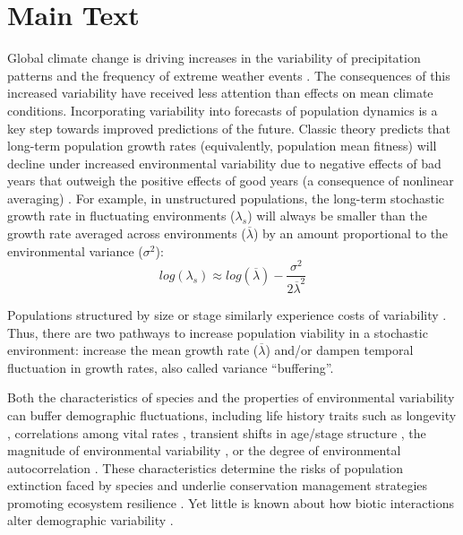 \documentclass[12pt]{article}
\begin{document}
\section*{Main Text}

Global climate change is driving increases in the variability of precipitation patterns and the frequency of extreme weather events \cite{IPCC2012managing,seneviratne2012changes,stocker2013technical}. 
The consequences of this increased variability have received less attention than effects on mean climate conditions. 
Incorporating variability into forecasts of population dynamics is a key step towards improved predictions of the future.
Classic theory predicts that long-term population growth rates (equivalently, population mean fitness) will decline under increased environmental variability due to negative effects of bad years that outweigh the positive effects of good years (a consequence of nonlinear averaging) \cite{lewontin_population_1969,tuljapurkar_population_1982}.
For example, in unstructured populations, the long-term stochastic growth rate in fluctuating environments ($\lambda_s$) will always be smaller than the growth rate averaged across environments ($\overline{\lambda}$) by an amount proportional to the environmental variance ($\sigma^2$): 
\begin{equation}
	 log(\lambda_s)  \approx log(\overline{\lambda}) - \frac{\sigma^2}{2\overline{\lambda}^2}
\end{equation}

Populations structured by size or stage similarly experience costs of variability \cite{cohen1979comparative,tuljapurkar2013population}.
Thus, there are two pathways to increase population viability in a stochastic environment: increase the mean growth rate ($\overline{\lambda}$) and/or dampen temporal fluctuation in growth rates, also called variance ``buffering''.

Both the characteristics of species and the properties of environmental variability can buffer demographic fluctuations, including life history traits such as longevity \cite{pfister1998patterns, morris2008longevity}, correlations among vital rates \cite{compagnoni2016effect}, transient shifts in age/stage structure \cite{ellis2013role}, the magnitude of environmental variability \cite{rodriguez2021limits}, or the degree of environmental autocorrelation \cite{tuljapurkar1980population,fieberg2001stochastic}. 
These characteristics determine the risks of population extinction faced by species \cite{menges2000applications} and underlie conservation management strategies promoting ecosystem resilience \cite{kuparinen2016fishing}. Yet little is known about how biotic interactions alter demographic variability \cite{hilde_demographic_2020}. 
\end{document}
